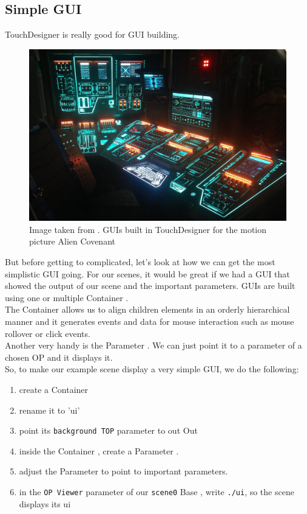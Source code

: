 \subsection{Simple GUI}

TouchDesigner is really good for GUI building.
\begin{figure}[H]
	\centering
	\includegraphics[width=\textwidth]{img/alien.jpg}
	\caption[shortCaption]
	{Image taken from . GUIs built in TouchDesigner for the motion picture Alien Covenant}
	\label{fig:label}
\end{figure}


But before getting to complicated, let's look at how we can get the most simplistic GUI going. For our scenes, it would be great if we had a GUI that showed the output of our scene and the important parameters. GUIs are built using one or multiple Container \COMPs.\\
The Container \COMP allows us to align children elements in an orderly hierarchical manner and it generates events and data for mouse interaction such as mouse rollover or click events. \\
Another very handy \COMP is the Parameter \COMP. We can just point it to a parameter of a chosen OP and it displays it.\\
So, to make our example scene display a very simple GUI, we do the following:

\begin{enumerate}
	\item create a Container \COMP
	\item rename it to 'ui'
	\item point its \texttt{background TOP} parameter to out Out \TOP
	\item inside the Container \COMP, create a Parameter \COMP.
	\item adjust the Parameter \COMP to point to important parameters.
	\item in the \texttt{OP Viewer} parameter of our \texttt{scene0} Base \COMP, write \texttt{./ui}, so the scene displays its ui
\end{enumerate}





